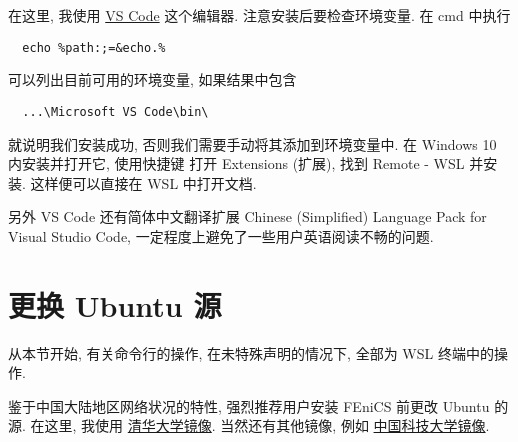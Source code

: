 \documentclass[fontset=founder]{ctexrep}
\begin{document}
在这里,
我使用
\href{https://code.visualstudio.com/}{VS Code}
这个编辑器.
注意安装后要检查环境变量.
在 \textsf{cmd} 中执行
\begin{lstlisting}
  echo %path:;=&echo.%
\end{lstlisting}
可以列出目前可用的环境变量,
如果结果中包含
\begin{lstlisting}
  ...\Microsoft VS Code\bin\
\end{lstlisting}
就说明我们安装成功,
否则我们需要手动将其添加到环境变量中.
在 Windows 10 内安装并打开它,
使用快捷键  打开 \textsf{Extensions (扩展)},
找到 \textsf{Remote - WSL} 并安装.
这样便可以直接在 WSL 中打开文档.

另外 VS Code 还有简体中文翻译扩展 \textsf{Chinese (Simplified) Language Pack for Visual Studio Code},
一定程度上避免了一些用户英语阅读不畅的问题.

\section{更换 Ubuntu 源}

从本节开始,
有关命令行的操作,
在未特殊声明的情况下,
全部为 WSL 终端中的操作.

鉴于中国大陆地区网络状况的特性,
强烈推荐用户安装 FEniCS 前更改 Ubuntu 的源.
在这里,
我使用%
\href{https://mirrors.tuna.tsinghua.edu.cn/help/ubuntu/}{清华大学镜像}.
当然还有其他镜像,
例如%
\href{https://mirrors.ustc.edu.cn/help/ubuntu.html}{中国科技大学镜像}.
\end{document}
